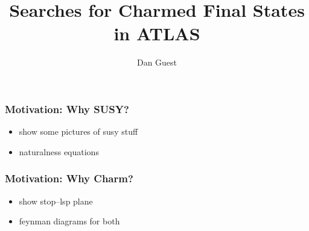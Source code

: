 \documentclass[usenames,dvipsnames]{beamer}
\title[Charmed Searches]{Searches for Charmed Final States in ATLAS}
\author[dhg3]{Dan Guest}
\institute[Yale]{Yale University}
\begin{document}
\maketitle

\begin{frame}
  \frametitle{Motivation: Why SUSY?}
  \begin{itemize}
  \item show some pictures of susy stuff
  \item naturalness equations
  \end{itemize}
\end{frame}

\begin{frame}
  \frametitle{Motivation: Why Charm?}
  \begin{itemize}
  \item show stop--lsp plane
  \item feynman diagrams for both
  \end{itemize}
\end{frame}
\end{document}
